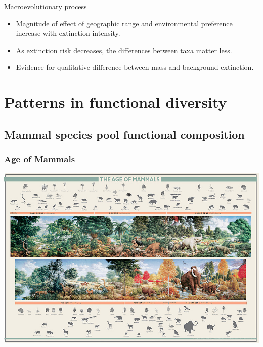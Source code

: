 \documentclass{beamer}
\begin{document}
\begin{frame}
  \begin{alertblock}{Macroevolutionary process}
    \begin{itemize}
      \item Magnitude of effect of geographic range and environmental preference increase with extinction intensity.
      \item As extinction risk decreases, the differences between taxa matter less.
      \item Evidence for qualitative difference between mass and background extinction.
    \end{itemize}
  \end{alertblock}
\end{frame}



\section{Patterns in functional diversity}
\subsection{Mammal species pool functional composition}

\begin{frame}
  \frametitle{Age of Mammals}
  \begin{center}
    \includegraphics[width = \textwidth,height = 0.8\textheight,keepaspectratio = true]{figure/aom}
  \end{center}
\end{frame}
\end{document}
